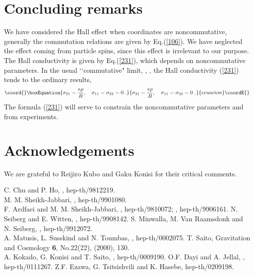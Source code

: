 \documentclass[a4paper,seceq]{ptptex}
\begin{document}
\section{Concluding remarks}
We have considered the Hall effect when coordinates are noncommutative,
generally the commutation relations are given by Eq.(\ref{106}).
We have neglected the effect coming from particle spins,
since this effect is irrelevant to our purpose.
The Hall conductivity is given by Eq.(\ref{231}),
which depends on noncommutative parameters.
In the usual \lq\lq commutative" limit,
\coordHE{}, \coordHE{},
the Hall conductivity (\ref{231}) tends to the ordinary results,
\begin{equation}\coord{}\boxEquation{
 \sigma _{21}=\frac{e\rho }{B}, \quad \sigma _{11}=\sigma _{22}=0~.
\label{401}
}{
 \sigma _{21}=\frac{e\rho }{B}, \quad \sigma _{11}=\sigma _{22}=0~.
}{ecuacion}\coordE{}\end{equation}
The formula (\ref{231}) will serve to constrain
the noncommutative parameters  \coordHE{} and \coordHE{}
from experiments.
\section*{Acknowledgements}
We are grateful to Reijiro Kubo and Gaku Konisi
for their critical comments.
%
%
\begin{thebibliography}{99}
   C. Chu and P. Ho, , hep-th/9812219.\\
   M. M. Sheikh-Jabbari, , hep-th/9901080.\\
   F. Ardfaei and M. M. Sheikh-Jabbari, ,
             hep-th/9810072; , hep-th/9906161.
   N. Seiberg and E. Witten, , hep-th/9908142.
   S. Minwalla, M. Van Raamsdonk and N. Seiberg, ,
             hep-th/9912072.\\
   A. Matusis, L. Susskind and N. Toumbas, ,
             hep-th/0002075.
  T. Saito, Gravitation and Cosmology {\bf 6}, No.22(22), (2000), 130.
\\
   A. Kokado, G. Konisi and T. Saito, , 
             hep-th/0009190.
   O.F. Dayi and A. Jellal, , hep-th/0111267.
  Z.F. Ezawa, G. Tsitsishvili and K. Hasebe,
             hep-th/0209198.
\end{thebibliography}
\end{document}
